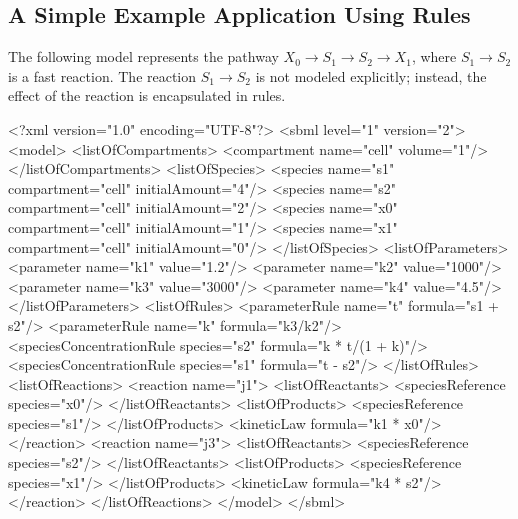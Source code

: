 \documentclass[10pt]{cekarticle}
\newcommand{\changed}[1]{\textcolor{BrickRed}{#1}}
\begin{document}
\subsection{A Simple Example Application Using Rules}
\label{subsection:ruleseg}

The following model represents the pathway $X_0 \to S_1 \to
S_2 \to X_1$, where $S_1 \to S_2$ is a fast reaction.  The
reaction $S_1 \to S_2$ is not modeled explicitly; instead, the
effect of the reaction is encapsulated in rules.


\begin{example}
<?xml version="1.0" encoding="UTF-8"?>
<sbml level="1" version="\changed{2}">
    <model>
        <listOfCompartments>
            <compartment name="cell" volume="1"/>
        </listOfCompartments>
        <listOfSpecies>
            <\changed{species} name="s1" compartment="cell" initialAmount="4"/>
            <\changed{species} name="s2" compartment="cell" initialAmount="2"/>
            <\changed{species} name="x0" compartment="cell" initialAmount="1"/>
            <\changed{species} name="x1" compartment="cell" initialAmount="0"/>
        </listOfSpecies>
        <listOfParameters>
            <parameter name="k1" value="1.2"/>
            <parameter name="k2" value="1000"/>
            <parameter name="k3" value="3000"/>
            <parameter name="k4" value="4.5"/>
        </listOfParameters>
        <listOfRules>
            <parameterRule name="t" formula="s1 + s2"/>
            <parameterRule name="k" formula="k3/k2"/>
            <\changed{speciesConcentrationRule} \changed{species=}"s2" formula="k * t/(1 + k)"/>
            <\changed{speciesConcentrationRule} \changed{species=}"s1" formula="t - s2"/>
        </listOfRules>
        <listOfReactions>
            <reaction name="j1">
                <listOfReactants>
                    <\changed{speciesReference} \changed{species=}"x0"/>
                </listOfReactants>
                <listOfProducts>
                    <\changed{speciesReference} \changed{species=}"s1"/>
                </listOfProducts>
                <kineticLaw formula="k1 * x0"/>
            </reaction>
            <reaction name="j3">
                <listOfReactants>
                    <\changed{speciesReference} \changed{species=}"s2"/>
                </listOfReactants>
                <listOfProducts>
                    <\changed{speciesReference} \changed{species=}"x1"/>
                </listOfProducts>
                <kineticLaw formula="k4 * s2"/>
            </reaction>
        </listOfReactions>
    </model>
</sbml>
\end{example}
\end{document}
